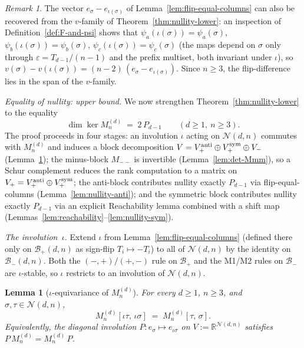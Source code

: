 \documentclass{amsart}
\newtheorem{lemma}[theorem]{Lemma}
\theoremstyle{definition}
\theoremstyle{remark}
\newtheorem{remark}[theorem]{Remark}
\newcommand{\R}{\mathbb{R}}
\begin{document}
\begin{remark}
The vector $e_\sigma - e_{\iota(\sigma)}$ of
Lemma~\ref{lem:flip-equal-columns} can also be recovered from
the $v$-family of Theorem~\ref{thm:nullity-lower}: an
inspection of Definition~\ref{def:F-and-psi} shows that
$\psi_a(\iota(\sigma)) = \psi_a(\sigma)$,
$\psi_b(\iota(\sigma)) = \psi_b(\sigma)$,
$\psi_c(\iota(\sigma)) = \psi_c(\sigma)$ (the maps depend on
$\sigma$ only through $\varepsilon = T_{d-1}/(n-1)$ and the
prefix multiset, both invariant under $\iota$), so
$v(\sigma) - v(\iota(\sigma)) = (n-2)\,(e_\sigma -
e_{\iota(\sigma)})$.  Since $n \ge 3$, the flip-difference lies
in the span of the $v$-family.
\end{remark}

\medskip
\noindent\textit{Equality of nullity: upper bound.}
\label{par:nullity-upper}
We now strengthen Theorem~\ref{thm:nullity-lower} to the
equality
\begin{equation}\label{eq:nullity-equal}
  \dim \ker M_n^{(d)} \;=\; 2\,P_{d-1}
  \qquad (d \ge 1,\ n \ge 3).
\end{equation}
The proof proceeds in four stages: an involution
$\iota$ acting on $\mathcal{N}(d, n)$ commutes with $M_n^{(d)}$
and induces a block decomposition $V = V_+^{\rm anti} \oplus
V_+^{\rm sym} \oplus V_-$
(Lemma~\ref{lem:iota-equivariance});
the minus-block $M_{--}$ is invertible
(Lemma~\ref{lem:det-Mmm}), so a Schur complement reduces the
rank computation to a matrix on $V_+ = V_+^{\rm anti} \oplus
V_+^{\rm sym}$; the anti-block contributes nullity exactly
$P_{d-1}$ via flip-equal-columns
(Lemma~\ref{lem:nullity-anti}); and the symmetric block
contributes nullity exactly $P_{d-1}$ via an explicit
Reachability lemma combined with a shift map
(Lemmas~\ref{lem:reachability}--\ref{lem:nullity-sym}).

\smallskip
\noindent\textit{The involution~$\iota$.}
Extend $\iota$ from
Lemma~\ref{lem:flip-equal-columns} (defined there only on
$\mathcal{B}_+(d, n)$ as sign-flip $T_i \mapsto -T_i$) to all of
$\mathcal{N}(d, n)$ by the identity on $\mathcal{B}_-(d, n)$.
Both the $(-, +)/(+, -)$ rule on $\mathcal{B}_+$ and the M1/M2
rules on $\mathcal{B}_-$ are $\iota$-stable, so $\iota$
restricts to an involution of $\mathcal{N}(d, n)$.

\begin{lemma}[$\iota$-equivariance of $M_n^{(d)}$]
\label{lem:iota-equivariance}
For every $d \ge 1$, $n \ge 3$, and $\sigma, \tau \in
\mathcal{N}(d, n)$,
\begin{equation}\label{eq:iota-equiv}
  M_n^{(d)}[\iota\tau,\, \iota\sigma]
  \;=\; M_n^{(d)}[\tau,\, \sigma].
\end{equation}
Equivalently, the diagonal involution
$P : e_\sigma \mapsto e_{\iota\sigma}$ on
$V := \R^{\mathcal{N}(d, n)}$ satisfies
$P\,M_n^{(d)} = M_n^{(d)}\,P$.
\end{lemma}
\end{document}
